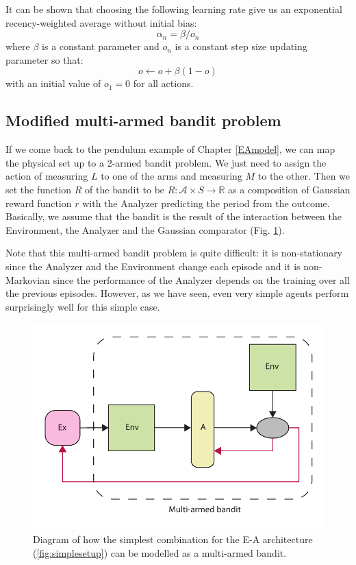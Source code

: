 \documentclass[11pt,a4paper,twoside]{report}
\newcommand{\+}{\textnormal{+} }
\theoremstyle{definition}
\numberwithin{equation}{chapter}
\begin{document}
  It can be shown that choosing the following learning rate give us an
  exponential recency-weighted average without initial bias:
  \begin{equation}
    \alpha_n = \beta/o_n
  \end{equation}
  where $\beta$ is a constant parameter and $o_n$ is a constant step size
  updating parameter so that:
  \begin{equation}
    o \gets o + \beta(1-o) 
  \end{equation}
  with an initial value of $o_1=0$ for all actions.

\subsection{Modified multi-armed bandit problem}

If we come back to the pendulum example of Chapter \ref{EAmodel}, we can map the
physical set up to a 2-armed bandit problem. We just need to assign the action
of  measuring $L$ to one of the arms and measuring $M$ to the other. Then we set
the function $R$ of the bandit to be $R:\mathcal{A}\times S\rightarrow
\mathbb{R}$ as a composition of Gaussian reward function $r$ with the Analyzer
predicting the period from the outcome. Basically, we assume that the bandit is
the result of the interaction between the Environment, the Analyzer and the
Gaussian comparator (Fig. \ref{fig:Bandit-EA}). \par Note that this multi-armed
bandit problem is quite difficult: it is non-stationary since the Analyzer and
the Environment change each episode and it is non-Markovian since the
performance of the Analyzer depends on the training over all the previous
episodes. However, as we have seen, even very simple agents perform surprisingly
well for this simple case.


\begin{figure}
  \centering 
\includegraphics[scale=0.75]{figures/Bandit-EA.pdf}
\caption{Diagram of how the simplest combination for the E-A architecture
(\ref{fig:simplesetup}) can be modelled as a multi-armed bandit.}
\label{fig:Bandit-EA}
\end{figure}
\end{document}
